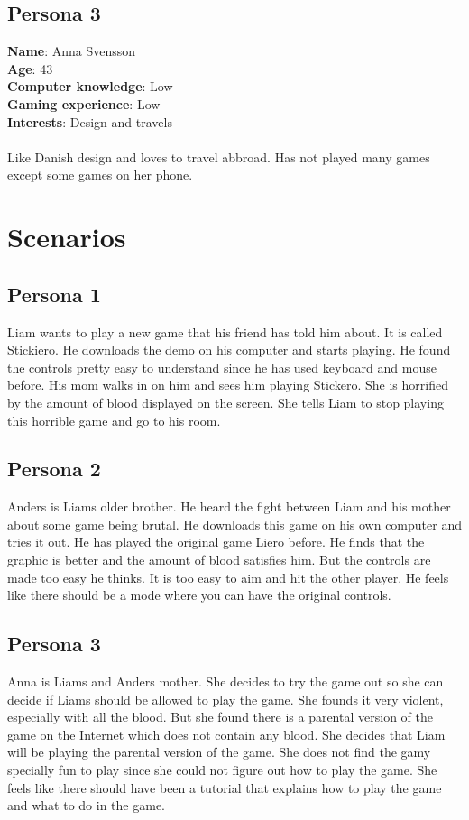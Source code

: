 \documentclass{article}
\begin{document}
\subsection{Persona 3}

\textbf{Name}: Anna Svensson\\
\textbf{Age}: 43\\
\textbf{Computer knowledge}: Low\\
\textbf{Gaming experience}: Low\\
\textbf{Interests}: Design and travels\\\\
Like Danish design and loves to travel abbroad. Has not played many games except some games on her phone. 

\newpage
\section{Scenarios}
\label{sec:label}
\subsection{Persona 1}
Liam wants to play a new game that his friend has told him about. It is called Stickiero. He downloads the demo on his computer and starts playing. He found the controls pretty easy to understand since he has used keyboard and mouse before. His mom walks in on him and sees him playing Stickero. She is horrified by the amount of blood displayed on the screen. She tells Liam to stop playing this horrible game and go to his room.
\subsection{Persona 2}
Anders is Liams older brother. He heard the fight between Liam and his mother about some game being brutal. He downloads this game on his own computer and tries it out. He has played the original game Liero before. He finds that the graphic is better and the amount of blood satisfies him. But the controls are made too easy he thinks. It is too easy to aim and hit the other player. He feels like there should be a mode where you can have the original controls.
\subsection{Persona 3}
Anna is Liams and Anders mother. She decides to try the game out so she can decide if Liams should be allowed to play the game. She founds it very violent, especially with all the blood. But she found there is a parental version of the game on the Internet which does not contain any blood. She decides that Liam will be playing the parental version of the game. She does not find the gamy specially fun to play since she could not figure out how to play the game. She feels like there should have been a tutorial that explains how to play the game and what to do in the game.
\end{document}
